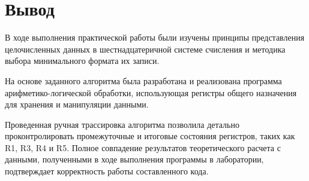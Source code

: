 \chapter{Вывод}
В ходе выполнения практической работы были изучены принципы представления целочисленных данных 
в шестнадцатеричной системе счисления и методика выбора минимального формата их записи.

На основе заданного алгоритма была разработана и реализована программа арифметико-логической обработки, 
использующая регистры общего назначения для хранения и манипуляции данными. 

Проведенная ручная трассировка алгоритма позволила детально проконтролировать промежуточные и итоговые состояния регистров, 
таких как R1, R3, R4 и R5. Полное совпадение результатов теоретического расчета с данными, 
полученными в ходе выполнения программы в лаборатории, подтверждает корректность работы составленного кода.